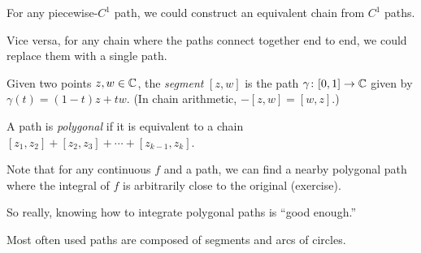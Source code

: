 \documentclass[10pt,aspectratio=169]{beamer}
\begin{document}
\begin{frame}
For any piecewise-$C^1$ path, we could construct an equivalent
chain from $C^1$ paths.

\medskip
\pause

Vice versa, for any chain where the paths connect together end to end,
we could replace them with a single path.

\medskip
\pause

Given two points $z,w \in {\mathbb{C}}$, the \emph{segment} $[z,w]$ is the path
$\gamma \colon [0,1] \to {\mathbb{C}}$ given by $\gamma(t) = (1-t)z + tw$.
\pause
(In chain arithmetic, $-[z,w] = [w,z]$.)

\medskip
\pause

A path is \emph{polygonal} if it is equivalent to a chain
$[z_1,z_2] + [z_2,z_3] + \cdots + [z_{k-1},z_k]$.

\medskip
\pause

Note that for any continuous $f$ and a path, we can find a nearby polygonal
path where the integral of $f$ is arbitrarily close to the original (exercise).

\medskip
\pause

So really, knowing how to integrate polygonal paths is
``good enough.''

\medskip
\pause

Most often used paths are composed of segments and arcs of circles.
\end{frame}
\end{document}
